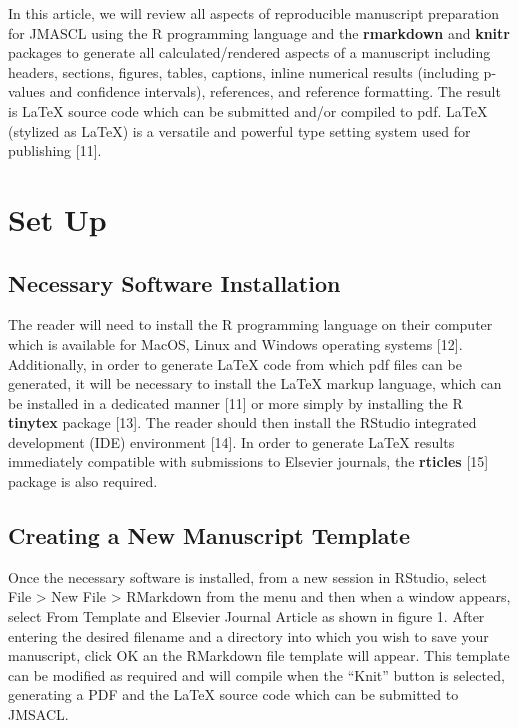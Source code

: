 \documentclass[]{elsarticle} %
\begin{document}
In this article, we will review all aspects of reproducible manuscript
preparation for JMASCL using the R programming language and the
\textbf{rmarkdown} and \textbf{knitr} packages to generate all
calculated/rendered aspects of a manuscript including headers, sections,
figures, tables, captions, inline numerical results (including p-values
and confidence intervals), references, and reference formatting. The
result is LaTeX source code which can be submitted and/or compiled to
pdf. LaTeX (stylized as \LaTeX) is a versatile and powerful type setting
system used for publishing {[}11{]}.

\hypertarget{set-up}{%
\section{Set Up}\label{set-up}}

\hypertarget{necessary-software-installation}{%
\subsection{Necessary Software
Installation}\label{necessary-software-installation}}

The reader will need to install the R programming language on their
computer which is available for MacOS, Linux and Windows operating
systems {[}12{]}. Additionally, in order to generate LaTeX code from
which pdf files can be generated, it will be necessary to install the
LaTeX markup language, which can be installed in a dedicated manner
{[}11{]} or more simply by installing the R \textbf{tinytex} package
{[}13{]}. The reader should then install the RStudio integrated
development (IDE) environment {[}14{]}. In order to generate LaTeX
results immediately compatible with submissions to Elsevier journals,
the \textbf{rticles} {[}15{]} package is also required.

\hypertarget{creating-a-new-manuscript-template}{%
\subsection{Creating a New Manuscript
Template}\label{creating-a-new-manuscript-template}}

Once the necessary software is installed, from a new session in RStudio,
select File \textgreater{} New File \textgreater{} RMarkdown from the
menu and then when a window appears, select From Template and Elsevier
Journal Article as shown in figure 1. After entering the desired
filename and a directory into which you wish to save your manuscript,
click OK an the RMarkdown file template will appear. This template can
be modified as required and will compile when the ``Knit'' button is
selected, generating a PDF and the LaTeX source code which can be
submitted to JMSACL.
\end{document}
